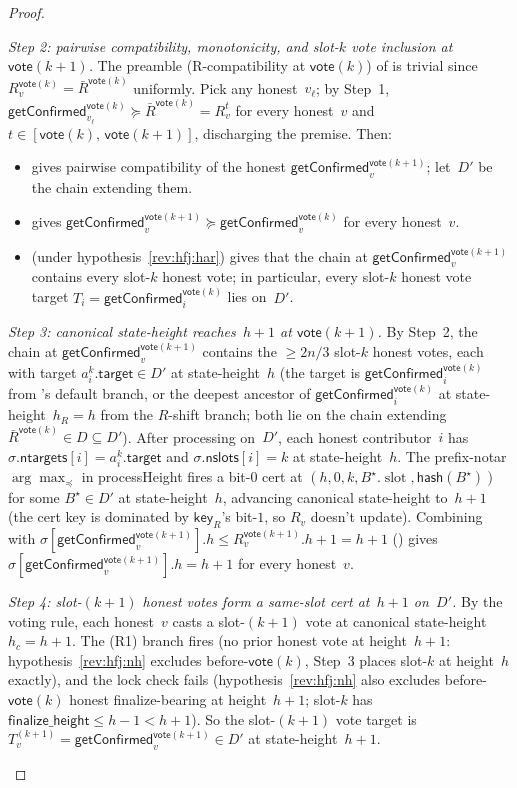 \documentclass{article}
\newcommand{\slot}[0]{\ensuremath{\operatorname{\mathrm{slot}}}}
\newcommand{\target}{\mathsf{target}}
\newcommand{\finalizeHeight}{\mathsf{finalize\_height}}
\newcommand{\ntargets}{\mathsf{ntargets}}
\newcommand{\nslots}{\mathsf{nslots}}
\newcommand{\hash}{\mathsf{hash}}
\newcommand{\key}{\mathsf{key}}
\newcommand{\vote}{\mathsf{vote}}
\newcommand{\comm}[1]{\bar{#1}}
\newcommand{\processHeight}{\textsf{processHeight}\xspace}
\newcommand{\getConfirmed}{\textsf{getConfirmed}\xspace}
\theoremstyle{plain}
\theoremstyle{definition}
\theoremstyle{remark}
\begin{document}
\begin{proof}
\begin{description}
\emph{Step 2: pairwise compatibility, monotonicity, and slot-$k$ vote inclusion at $\vote(k+1)$.}
The preamble (R-compatibility at $\vote(k)$) of  is trivial since $R_v^{\vote(k)} = \comm{R}^{\vote(k)}$ uniformly. Pick any honest~$v_\ell$; by Step~1, $\getConfirmed_{v_\ell}^{\vote(k)} \succeq \comm{R}^{\vote(k)} = R_v^t$ for every honest~$v$ and $t \in [\vote(k),\, \vote(k+1)]$, discharging the premise. Then:
\begin{itemize}
  \item {} gives pairwise compatibility of the honest $\getConfirmed_v^{\vote(k+1)}$; let~$D'$ be the chain extending them.
  \item {} gives $\getConfirmed_v^{\vote(k+1)} \succeq \getConfirmed_v^{\vote(k)}$ for every honest~$v$.
  \item {} (under hypothesis~\ref{rev:hfj:har}) gives that the chain at $\getConfirmed_v^{\vote(k+1)}$ contains every slot-$k$ honest vote; in particular, every slot-$k$ honest vote target $T_i = \getConfirmed_i^{\vote(k)}$ lies on~$D'$.
\end{itemize}

\emph{Step 3: canonical state-height reaches~$h+1$ at $\vote(k+1)$.}
By Step~2, the chain at $\getConfirmed_v^{\vote(k+1)}$ contains the $\geq 2n/3$ slot-$k$ honest votes, each with target $a^k_i.\target \in D'$ at state-height~$h$ (the target is $\getConfirmed_i^{\vote(k)}$ from 's default branch, or the deepest ancestor of $\getConfirmed_i^{\vote(k)}$ at state-height~$h_R = h$ from the $R$-shift branch; both lie on the chain extending $\comm{R}^{\vote(k)} \in D \subseteq D'$). After processing on~$D'$, each honest contributor~$i$ has $\sigma.\ntargets[i] = a^k_i.\target$ and $\sigma.\nslots[i] = k$ at state-height~$h$. The prefix-notar $\arg\max_\preceq$ in \processHeight{} fires a bit-$0$ cert at $(h, 0, k, B^\star.\slot, \hash(B^\star))$ for some $B^\star \in D'$ at state-height~$h$, advancing canonical state-height to~$h+1$ (the cert key is dominated by $\key_R$'s bit-$1$, so $R_v$ doesn't update). Combining with $\sigma[\getConfirmed_v^{\vote(k+1)}].h \leq R_v^{\vote(k+1)}.h + 1 = h+1$ () gives $\sigma[\getConfirmed_v^{\vote(k+1)}].h = h+1$ for every honest~$v$.

\emph{Step 4: slot-$(k+1)$ honest votes form a same-slot cert at~$h+1$ on~$D'$.}
By the voting rule, each honest~$v$ casts a slot-$(k+1)$ vote at canonical state-height~$h_c = h+1$. The (R1) branch fires (no prior honest vote at height~$h+1$: hypothesis~\ref{rev:hfj:nh} excludes before-$\vote(k)$, Step~3 places slot-$k$ at height~$h$ exactly), and the lock check fails (hypothesis~\ref{rev:hfj:nh} also excludes before-$\vote(k)$ honest finalize-bearing at height~$h+1$; slot-$k$ has $\finalizeHeight \leq h - 1 < h+1$). So the slot-$(k+1)$ vote target is $T_v^{(k+1)} = \getConfirmed_v^{\vote(k+1)} \in D'$ at state-height~$h+1$.


\end{description}
\end{proof}
\end{document}
